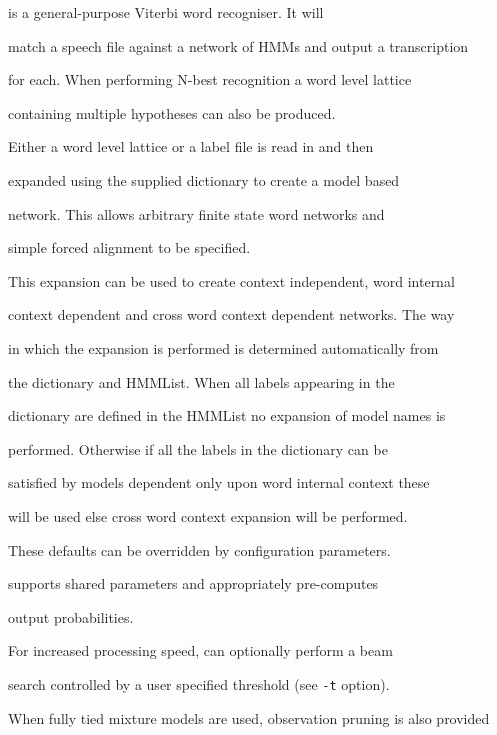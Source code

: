  is a general-purpose Viterbi word recogniser.  It will 


match a speech file against a network of HMMs and output a transcription 


for each.  When performing N-best recognition a word level lattice 


containing multiple hypotheses can also be produced.





Either a word level lattice or a label file is read in and then


expanded using the supplied dictionary to create a model based 


network.  This allows arbitrary finite state word networks and


simple forced alignment to be specified.





This expansion can be used to create context independent, word internal


context dependent and cross word context dependent networks.  The way


in which the expansion is performed is determined automatically from


the dictionary and HMMList.  When all labels appearing in the


dictionary are defined in the HMMList no expansion of model names is 


performed.  Otherwise if all the labels in the dictionary can be 


satisfied by models dependent only upon word internal context these


will be used else cross word context expansion will be performed.


These defaults can be overridden by  configuration parameters.





 supports shared parameters and appropriately pre-computes 


output probabilities. 


For increased processing speed,  can optionally perform a beam


search controlled by a user specified threshold (see \texttt{-t} option).


When fully tied mixture models are used, observation pruning is also provided


